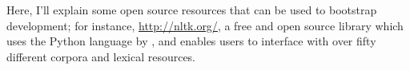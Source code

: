 Here, I'll explain some open source resources that can be used to bootstrap development; for instance, \href{NLTK (Natural Language Toolkit)}{http://nltk.org/}, a free and open source library which uses the Python language by \citet{bird2006nltk}, and enables users to interface with over fifty different corpora and lexical resources.




%
%

